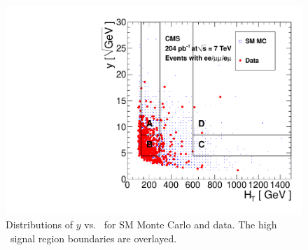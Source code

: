 \begin{figure}[tbh]
\begin{center}
\includegraphics[width=0.6\linewidth]{plots/abcd_204pb_highht.pdf}
\caption{\label{fig:abcdData3}\protect Distributions of $y$ 
vs. \Ht\ for SM Monte Carlo and data. The high \Ht\ signal region boundaries are overlayed.}
\end{center}
\end{figure}

